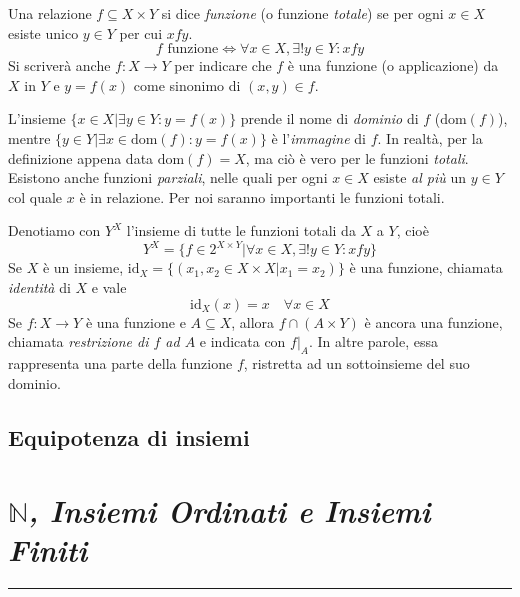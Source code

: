 \documentclass[oneside]{book}
\newcommand{\chptr}[1]{\chapter{\textit{#1}}\noindent\rule{\textwidth}{1pt}}
\theoremstyle{remark}
\begin{document}
\begin{tcolorbox}[colback=yellow!30, colframe=yellow!30!black, title={Funzione}]
Una relazione $f\subseteq X\times Y$ si dice \textit{funzione} (o funzione
\textit{totale}) se per ogni $x\in X$ esiste unico $y\in Y$ per cui $xfy$.
\[ f \text{ funzione} \Longleftrightarrow \forall x\in X,\exists!y\in Y:xfy \]
Si scriverà anche $f:X\to Y$ per indicare che $f$ è una funzione (o applicazione)
da $X$ in $Y$ e $y=f(x)$ come sinonimo di $(x,y)\in f$.
\end{tcolorbox}

L'insieme $\{x\in X|\exists y\in Y: y=f(x)\}$ prende il nome di \textit{dominio}
di $f$ ($\text{dom}(f)$), mentre $\{y\in Y|\exists x\in\text{dom}(f):y=f(x)\}$
è l'\textit{immagine} di $f$. In realtà, per la definizione appena data
$\text{dom}(f)=X$, ma ciò è vero per le funzioni \textit{totali}. Esistono
anche funzioni \textit{parziali}, nelle quali per ogni $x\in X$ esiste \textit{al più}
un $y\in Y$ col quale $x$ è in relazione. Per noi saranno importanti le funzioni
totali.

Denotiamo con $Y^X$ l'insieme di tutte le funzioni totali da $X$ a $Y$, cioè
\[ Y^X = \{f\in2^{X\times Y}| \forall x\in X, \exists!y\in Y: xfy\} \]
Se $X$ è un insieme, $\text{id}_X = \{(x_1,x_2\in X\times X| x_1=x_2)\}$ è
una funzione, chiamata \textit{identità} di $X$ e vale \[ \text{id}_X(x)=x \quad \forall x\in X\]
Se $f:X\to Y$ è una funzione e $A\subseteq X$, allora $f\cap(A\times Y)$
è ancora una funzione, chiamata \textit{restrizione di $f$ ad $A$} e indicata
con $f|_A$. In altre parole, essa rappresenta una parte della funzione $f$,
ristretta ad un sottoinsieme del suo dominio.

\begin{tcolorbox}[colback=yellow!30, colframe=yellow!30!black, title={Composizione}]
\end{tcolorbox}
\begin{tcolorbox}[colback=yellow!30, colframe=yellow!30!black, title={Iniettività, surgettività, bigettività}]
\end{tcolorbox}




\section{Equipotenza di insiemi}






\chptr{$\mathbb{N}$, Insiemi Ordinati e Insiemi Finiti}
\end{document}
